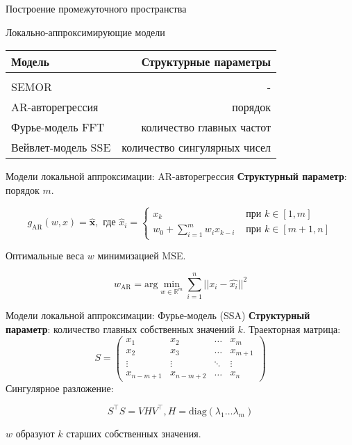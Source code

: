 \documentclass{beamer}
\newcommand{\bx}{\mathbf{x}}
\newcommand{\R}{\mathbb{R}}
\begin{document}


\begin{frame}{Построение промежуточного пространства}
    \begin{block}{Локально-аппроксимирующие модели}
    \begin{center}
        \begin{tabular}{| l | r |}
            Модель & Структурные параметры \\
            \hline \\
            SEMOR & - \\
            AR-авторегрессия & порядок \\
            Фурье-модель FFT & количество главных частот \\
            Вейвлет-модель SSE & количество сингулярных чисел\\
            \hline
            \end{tabular}
    \end{center}
    \end{block}
\end{frame}


\begin{frame}{Модели локальной аппроксимации: AR-авторегрессия}
    \textbf{Структурный параметр}: порядок $m$.

$$
g_{\text{AR}}(w, x) = \hat{\bx}, \text{ где }
\hat{x}_i = \begin{cases}
    x_k & \text{ при } k \in [1, m] \\
    w_0 + \sum_{i=1}^m w_i x_{k - i} & \text{ при } k \in [m + 1, n]
\end{cases}
$$

Оптимальные веса $w$ минимизацией MSE.

$$
w_{\text{AR}} = \mathrm{arg}\min_{w \in \R^m} \sum_{i=1}^{n}||x_i - \hat{x_i}||^2
$$
\end{frame}


\begin{frame}{Модели локальной аппроксимации: Фурье-модель (SSA)}
    \textbf{Структурный параметр}: количество главных собственных значений $k$.
    Траекторная матрица:
$$
    S = \begin{pmatrix}
    x_1 & x_2 & \dots & x_m \\
    x_2 & x_3 & \dots & x_{m + 1} \\
    \vdots & \vdots & \ddots & \vdots \\
    x_{n - m + 1} & x_{n - m + 2} & \dots & x_n
    \end{pmatrix}
$$
Сингулярное разложение:

$$
S^\intercal S = VHV^\intercal, H = \mathrm{diag}(\lambda_1 \ldots \lambda_m)
$$

$w$ образуют $k$ старших собственных значения.
\end{frame}
\end{document}
